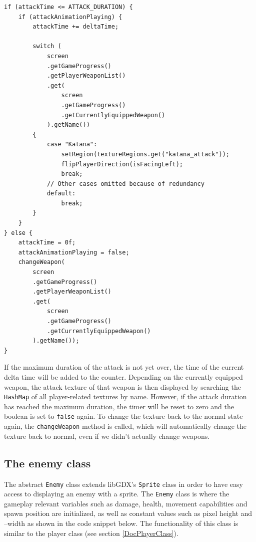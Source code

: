 \documentclass[12p]{article}
\begin{document}
\begin{verbatim}
if (attackTime <= ATTACK_DURATION) {
    if (attackAnimationPlaying) {
        attackTime += deltaTime;

        switch (
            screen
            .getGameProgress()
            .getPlayerWeaponList()
            .get(
                screen
                .getGameProgress()
                .getCurrentlyEquippedWeapon()
            ).getName()) 
        {
            case "Katana":
                setRegion(textureRegions.get("katana_attack"));
                flipPlayerDirection(isFacingLeft);
                break;
            // Other cases omitted because of redundancy
            default:
                break;
        }
    }
} else {
    attackTime = 0f;
    attackAnimationPlaying = false;
    changeWeapon(
        screen
        .getGameProgress()
        .getPlayerWeaponList()
        .get(
            screen
            .getGameProgress()
            .getCurrentlyEquippedWeapon()
        ).getName());
}
\end{verbatim}

If the maximum duration of the attack is not yet over, the time of the current delta time will be added to the counter. Depending on the currently equipped weapon, the attack texture of that weapon is then displayed by searching the \texttt{HashMap} of all player-related textures by name. However, if the attack duration has reached the maximum duration, the timer will be reset to zero and the boolean is set to \texttt{false} again. To change the texture back to the normal state again, the \texttt{changeWeapon} method is called, which will automatically change the texture back to normal, even if we didn't actually change weapons.


\newpage
\subsection{The enemy class} \label{DocEnemyClass}

The abstract \texttt{Enemy} class extends libGDX's \texttt{Sprite} class in order to have easy access to displaying an enemy with a sprite. The \texttt{Enemy} class is where the gameplay relevant variables such as damage, health, movement capabilities and spawn position are initialized, as well as constant values such as pixel height and –width as shown in the code snippet below. The functionality of this class is similar to the player class (see section \ref{DocPlayerClass}).
\end{document}
